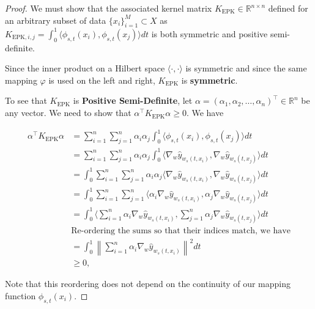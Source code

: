 \begin{proof}
We must show that the associated kernel matrix $K_{\text{EPK}} \in \mathbb{R}^{n\times n}$ defined for an arbitrary subset of data $\{x_i\}_{i=1}^M \subset X$ as $K_{\text{EPK},i,j} = \int_0^1\langle \phi_{s,t}(x_i), \phi_{s,t}(x_j)\rangle dt$ is both symmetric and positive semi-definite.

Since the inner product on a Hilbert space $\langle \cdot, \cdot \rangle$ is symmetric and since the same mapping $\varphi$ is used on the left and right, $K_{\text{EPK}}$ is \textbf{symmetric}. 

To see that $K_{\text{EPK}}$ is \textbf{Positive Semi-Definite}, let $\alpha = (\alpha_1, \alpha_2, \dots, \alpha_n)^\top \in \mathbb{R}^n$ be any vector. We need to show that $\alpha^\top K_{\text{EPK}} \alpha \geq 0$. We have

\begin{align}
\alpha^\top K_{\text{EPK}} \alpha &= \sum_{i=1}^n \sum_{j=1}^n \alpha_i \alpha_j \int_0^1 \langle \phi_{s,t}(x_i), \phi_{s,t}(x_j)\rangle dt \\
&= \sum_{i=1}^n \sum_{j=1}^n \alpha_i \alpha_j \int_0^1 \langle \nabla_{w}\hat{y}_{w_s(t,x_i)}, \nabla_{w}\hat{y}_{w_s(t,x_j)}\rangle dt \\
&= \int_0^1 \sum_{i=1}^n \sum_{j=1}^n \alpha_i \alpha_j \langle \nabla_{w}\hat{y}_{w_s(t,x_i)}, \nabla_{w}\hat{y}_{w_s(t,x_j)}\rangle dt \\
&= \int_0^1 \sum_{i=1}^n \sum_{j=1}^n  \langle \alpha_i \nabla_{w}\hat{y}_{w_s(t,x_i)}, \alpha_j \nabla_{w}\hat{y}_{w_s(t,x_j)}\rangle dt \\
&= \int_0^1    \langle \sum_{i=1}^n \alpha_i \nabla_{w}\hat{y}_{w_s(t,x_i)}, \sum_{j=1}^n \alpha_j \nabla_{w}\hat{y}_{w_s(t,x_j)}\rangle dt \\
& \text{Re-ordering the sums so that their indices match, we have}\\
&= \int_0^1 \left\lVert \sum_{i=1}^n \alpha_i \nabla_{w}\hat{y}_{w_s(t,x_i)}\right\rVert^2 dt \\
&\geq 0,
\end{align}

Note that this reordering does not depend on the continuity of our mapping function $\phi_{s,t}(x_i)$.

\end{proof}


